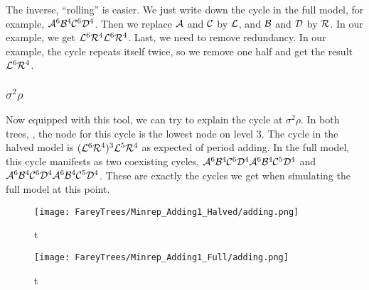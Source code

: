 The inverse, ``rolling'' is easier.
We just write down the cycle in the full model, for example, $\mathcal{A}^6\mathcal{B}^4\mathcal{C}^6\mathcal{D}^4$.
Then we replace $\mathcal{A}$ and $\mathcal{C}$ by $\mathcal{L}$, and $\mathcal{B}$ and $\mathcal{D}$ by $\mathcal{R}$.
In our example, we get $\mathcal{L}^6\mathcal{R}^4\mathcal{L}^6\mathcal{R}^4$.
Last, we need to remove redundancy.
In our example, the cycle repeats itself twice, so we remove one half and get the result $\mathcal{L}^6\mathcal{R}^4$.

\subsubsection{$\sigma^2\rho$}

Now equipped with this tool, we can try to explain the cycle at $\sigma^2\rho$.
In both trees, , the node for this cycle is the lowest node on level 3.
The cycle in the halved model is $(\mathcal{L}^6\mathcal{R}^4)^3\mathcal{L}^5\mathcal{R}^4$ as expected of period adding.
In the full model, this cycle manifests as two coexisting cycles, $\mathcal{A}^6\mathcal{B}^4\mathcal{C}^6\mathcal{D}^4\mathcal{A}^6\mathcal{B}^4\mathcal{C}^5\mathcal{D}^4$ and $\mathcal{A}^6\mathcal{B}^4\mathcal{C}^6\mathcal{D}^4\mathcal{A}^6\mathcal{B}^4\mathcal{C}^5\mathcal{D}^4$.
These are exactly the cycles we get when simulating the full model at this point.

\begin{figure}
    \centering
    \texttt{[image: FareyTrees/Minrep\_Adding1\_Halved/adding.png]}
    \caption{t}
    \label{fig:tree.adding1.hor.halved}
\end{figure}

\begin{figure}
    \centering
    \texttt{[image: FareyTrees/Minrep\_Adding1\_Full/adding.png]}
    \caption{t}
    \label{fig:tree.adding1.hor.full}
\end{figure}